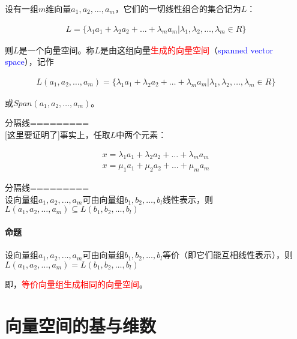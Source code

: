 \documentclass[UTF8]{ctexbook}
\begin{document}
设有一组$m$维向量$a_{1},a_{2},\dots,a_{m}$，它们的一切线性组合的集合记为$L$：

\begin{equation}
\begin{aligned}
L=\{ \lambda_{1}a_{1}+\lambda_{2}a_{2}+\dots+\lambda_{m}a_{m} | \lambda_{1},\lambda_{2},\dots,\lambda_{m} \in R \}
\end{aligned}
\end{equation}

则$L$是一个向量空间。称$L$是由这组向量\textcolor{red}{生成的向量空间}（\textcolor{blue}{spanned vector space}），记作

\begin{equation}
\begin{aligned}
L(a_{1},a_{2},\dots,a_{m})=\{ \lambda_{1}a_{1}+\lambda_{2}a_{2}+\dots+\lambda_{m}a_{m} | \lambda_{1},\lambda_{2},\dots,\lambda_{m} \in R \}
\end{aligned}
\end{equation}

或$Span(a_{1},a_{2},\dots,a_{m})$。


分隔线=========\\

[这里要证明了]事实上，任取$L$中两个元素：

\begin{equation}
\begin{aligned}
x=\lambda_{1}a_{1}+\lambda_{2}a_{2}+\dots+\lambda_{m}a_{m}\\
x=\mu_{1}a_{1}+\mu_{2}a_{2}+\dots+\mu_{m}a_{m}
\end{aligned}
\end{equation}

分隔线=========\\

设向量组$a_{1},a_{2},\dots,a_{m}$可由向量组$b_{1},b_{2},\dots,b_{l}$线性表示，则$L(a_{1},a_{2},\dots,a_{m}) \subseteq L(b_{1},b_{2},\dots,b_{l})$

\paragraph{命题} 设向量组$a_{1},a_{2},\dots,a_{m}$可由向量组$b_{1},b_{2},\dots,b_{l}$等价（即它们能互相线性表示），则$L(a_{1},a_{2},\dots,a_{m}) = L(b_{1},b_{2},\dots,b_{l})$

即，\textcolor{red}{等价向量组生成相同的向量空间}。

\section{向量空间的基与维数}
\end{document}
